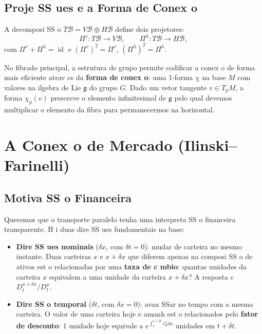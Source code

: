 {\subsection{Proje SS ues e a Forma de Conex o}

A decomposi SS o $T\mathcal{B} = V\mathcal{B} \oplus H\mathcal{B}$
define dois projetores:
\begin{equation}\label{eq:projectors}
 \Pi^v: T\mathcal{B} \to V\mathcal{B}, \qquad
 \Pi^h: T\mathcal{B} \to H\mathcal{B},
\end{equation}
com $\Pi^v + \Pi^h = \operatorname{id}$ e $(\Pi^v)^2 = \Pi^v$,
$(\Pi^h)^2 = \Pi^h$.

No fibrado principal, a estrutura de grupo permite codificar a conex o
de forma mais eficiente atrav cs da \textbf{forma de conex o}: uma
1-forma $\chi$ na base $M$ com valores na ilgebra de Lie $\mathfrak{g}$
do grupo $G$. Dado um vetor tangente $v \in T_pM$, a forma $\chi_p(v)$
prescreve o elemento infinitesimal de $\mathfrak{g}$ pelo qual devemos
multiplicar o elemento da fibra para permanecermos na horizontal.

\section{A Conex o de Mercado (Ilinski--Farinelli)}

\subsection{Motiva SS o Financeira}

Queremos que o transporte paralelo tenha uma interpreta SS o financeira
transparente. H i duas dire SS ues fundamentais na base:

\begin{itemize}
 \item \textbf{Dire SS ues nominais} ($\delta x$, com $\delta t = 0$):
 mudar de carteira no mesmo instante. Duas carteiras $x$ e
 $x + \delta x$ que diferem apenas na composi SS o de ativos
 est o relacionadas por uma \textbf{taxa de c mbio}: quantas
 unidades da carteira $x$ equivalem a uma unidade da carteira
 $x + \delta x$? A resposta c $D_t^{x+\delta x} / D_t^x$.
 \item \textbf{Dire SS o temporal} ($\delta t$, com $\delta x = 0$):
 avan SSar no tempo com a mesma carteira. O valor de uma
 carteira hoje e amanh est o relacionados pelo \textbf{fator
 de desconto}: $1$ unidade hoje equivale a $e^{\int_t^{t+\delta
 t} r_u^x du}$ unidades em $t+\delta t$.
\end{itemize}

}
